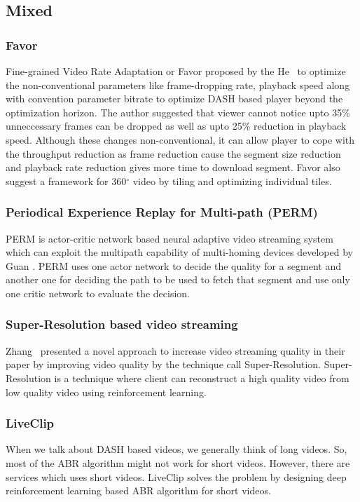 \subsection{Mixed}



\subsubsection{Favor}
Fine-grained Video Rate Adaptation or Favor\cite{10.1145/3204949.3204957} proposed by the He \etal\ to optimize the non-conventional parameters like frame-dropping rate, playback speed along with convention parameter bitrate to optimize DASH based player beyond the optimization horizon. The author suggested that viewer cannot notice upto 35\% unneccessary frames can be dropped as well as upto 25\% reduction in playback speed. Although these changes non-conventional, it can allow player to cope with the throughput reduction as frame reduction cause the segment size reduction and playback rate reduction gives more time to download segment. Favor also suggest a framework for 360$^{\circ}$ video by tiling and optimizing individual tiles.


\subsubsection{Periodical Experience Replay for Multi-path (PERM)}
PERM\cite{9155492} is actor-critic network based neural adaptive video streaming system which can exploit the multipath capability of multi-homing devices developed by Guan \etal. PERM uses one actor network to decide the quality for a segment and another one for deciding the path to be used to fetch that segment and use only one critic network to evaluate the decision.

\subsubsection{Super-Resolution based video streaming}
Zhang \etal\ presented a novel approach to increase video streaming quality in their paper \cite{9155384} by improving video quality by the technique call Super-Resolution. Super-Resolution is a technique where client can reconstruct a high quality video from low quality video using reinforcement learning.

\subsubsection{LiveClip}
When we talk about DASH based videos, we generally think of long videos. So, most of the ABR algorithm might not work for short videos. However, there are services which uses short videos. LiveClip\cite{10.1145/3386290.3396937} solves the problem by designing deep reinforcement learning based ABR algorithm for short videos.

